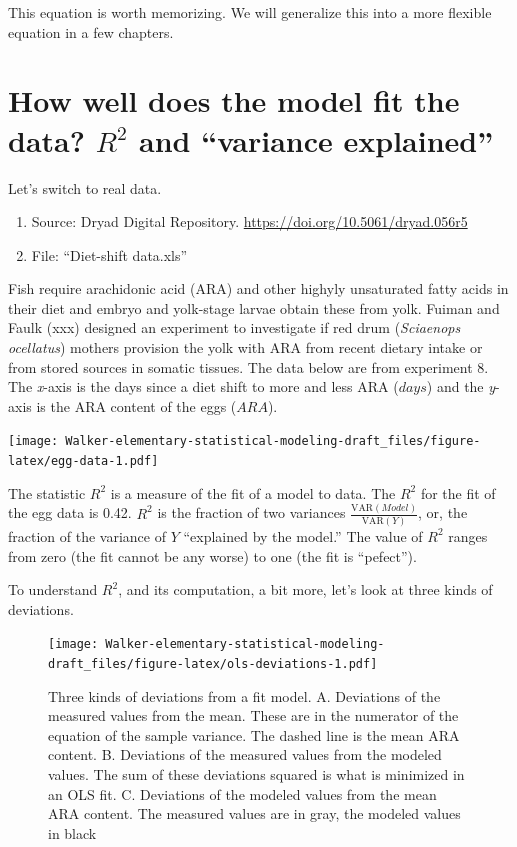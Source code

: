 \documentclass[]{book}
\providecommand{\tightlist}{%
  \setlength{\itemsep}{0pt}\setlength{\parskip}{0pt}}
\begin{document}
This equation is worth memorizing. We will generalize this into a more flexible equation in a few chapters.

\hypertarget{how-well-does-the-model-fit-the-data-r2-and-variance-explained}{%
\section{\texorpdfstring{How well does the model fit the data? \(R^2\) and ``variance explained''}{How well does the model fit the data? R\^{}2 and ``variance explained''}}\label{how-well-does-the-model-fit-the-data-r2-and-variance-explained}}

Let's switch to real data.

\begin{enumerate}
\def\labelenumi{\arabic{enumi}.}
\tightlist
\item
  Source: Dryad Digital Repository. \url{https://doi.org/10.5061/dryad.056r5}
\item
  File: ``Diet-shift data.xls''
\end{enumerate}

Fish require arachidonic acid (ARA) and other highyly unsaturated fatty acids in their diet and embryo and yolk-stage larvae obtain these from yolk. Fuiman and Faulk (xxx) designed an experiment to investigate if red drum (\emph{Sciaenops ocellatus}) mothers provision the yolk with ARA from recent dietary intake or from stored sources in somatic tissues. The data below are from experiment 8. The \emph{x}-axis is the days since a diet shift to more and less ARA (\(days\)) and the \emph{y}-axis is the ARA content of the eggs (\(ARA\)).

\texttt{[image: Walker-elementary-statistical-modeling-draft\_files/figure-latex/egg-data-1.pdf]}

The statistic \(R^2\) is a measure of the fit of a model to data. The \(R^2\) for the fit of the egg data is 0.42. \(R^2\) is the fraction of two variances \(\frac{\mathrm{VAR}(Model)}{\mathrm{VAR}(Y)}\), or, the fraction of the variance of \(Y\) ``explained by the model.'' The value of \(R^2\) ranges from zero (the fit cannot be any worse) to one (the fit is ``pefect'').

To understand \(R^2\), and its computation, a bit more, let's look at three kinds of deviations.

\begin{figure}
\centering
\texttt{[image: Walker-elementary-statistical-modeling-draft\_files/figure-latex/ols-deviations-1.pdf]}
\caption{\label{fig:ols-deviations}Three kinds of deviations from a fit model. A. Deviations of the measured values from the mean. These are in the numerator of the equation of the sample variance. The dashed line is the mean ARA content. B. Deviations of the measured values from the modeled values. The sum of these deviations squared is what is minimized in an OLS fit. C. Deviations of the modeled values from the mean ARA content. The measured values are in gray, the modeled values in black}
\end{figure}
\end{document}
